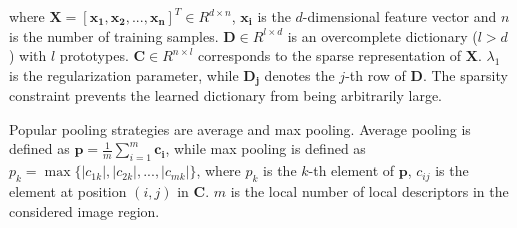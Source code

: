 \documentclass{article}
\begin{document}
\noindent where $\mathbf{X = [x_1, x_2, ..., x_n]}^T \in R^{d \times n}$, $\mathbf{x_i}$ is the $d$-dimensional feature vector and $n$ is the number of training samples. $\mathbf{D} \in R^{l \times d}$ is an overcomplete dictionary ($l > d $) with $l$ prototypes. $\mathbf{C} \in R^{n \times l}$ corresponds to the sparse representation of $\mathbf{X}$. $\lambda_1$ is the regularization parameter, while $\mathbf{D_{j}}$ denotes the $j$-th row of $\mathbf{D}$. The sparsity constraint prevents the learned dictionary from being arbitrarily large.

Popular pooling strategies are average and max pooling. Average pooling is defined as $\mathbf{p} = \frac{1}{m}\sum\limits_{i = 1}^m {\mathbf{c_i} }$, while max pooling
is defined as $p_k = \max \{ \left| {c_{1k} } \right|,\left| {c_{2k} } \right|,...,\left| {c_{mk} } \right|\}$, where $p_k$ is the $k$-th element of $\mathbf{p}$, $c_{ij}$ is the element at position $(i,j)$ in $\mathbf{C}$. $m$ is the local number of local descriptors in the considered image region.
\end{document}
